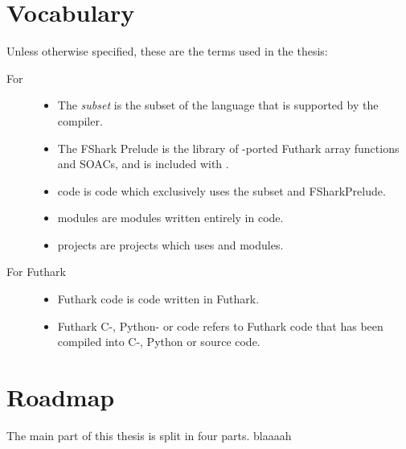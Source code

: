 \clearpage
\section*{Vocabulary}
Unless otherwise specified, these are the terms used in the thesis:
\begin{description}
\item[For \fshark{}]\hfill
  \begin{itemize}
  \item The \fshark{} \textit{subset} is the subset of the \fsharp{} language
    that is supported by the \fshark{} compiler.

  \item The FShark Prelude is the library of \fsharp{}-ported Futhark array
    functions and SOACs, and is included with \fshark{}.

  \item \fshark{} code is \fsharp{} code which exclusively uses the \fshark{}
    subset and FSharkPrelude.

  \item \fshark{} modules are \fsharp{} modules written entirely in \fshark{}
    code.
    
  \item \fshark{} projects are \fsharp{} projects which uses \fshark{} and
    \fshark{} modules.
    \\
  \end{itemize}

\item[For Futhark]\hfill
  \begin{itemize}

  \item Futhark code is code written in Futhark.

  \item Futhark C-, Python- or \csharp{} code refers to Futhark code that has been compiled
    into C-, Python or \csharp{} source code.

  \end{itemize}
\end{description}



\section*{Roadmap}
The main part of this thesis is split in four parts.
blaaaah


